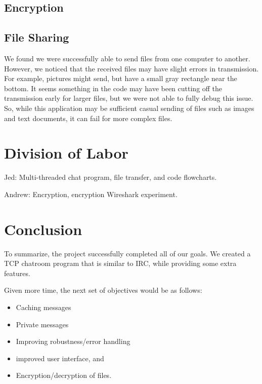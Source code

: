 \documentclass{article}
\begin{document}
\subsection{Encryption}

\subsection{File Sharing}
We found we were successfully able to send files from one computer to another. However, we noticed that the received files may have slight errors in transmission. For example, pictures might send, but have a small gray rectangle near the bottom. It seems something in the code may have been cutting off the transmission early for larger files, but we were not able to fully debug this issue. So, while this application may be sufficient casual sending of files such as images and text documents, it can fail for more complex files.


\section{Division of Labor}

Jed: Multi-threaded chat program, file transfer, and code flowcharts. 

Andrew: Encryption, encryption Wireshark experiment. 

\section{Conclusion}

To summarize, the project successfully completed all of our goals. We created a TCP chatroom program that is similar to IRC, while providing some extra features. 

Given more time, the next set of objectives would be as follows: 
\begin{itemize}
  \item Caching messages
  \item Private messages
  \item Improving robustness/error handling
  \item improved user interface, and
  \item Encryption/decryption of files. 
\end{itemize}
\end{document}
